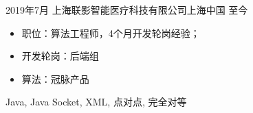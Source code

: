 %
%




\begin{experiences}
 \experience
    {2019年7月}   { 上海联影智能医疗科技有限公司}{上海}{中国}
    {至今} {
                      \begin{itemize}
                        \item 职位：算法工程师，4个月开发轮岗经验；
                        \item 开发轮岗：后端组
                        \item 算法：冠脉产品
                      \end{itemize}
                      \vspace{2pt}
                    }
                    {Java, Java Socket, XML, 点对点, 完全对等}
\end{experiences}